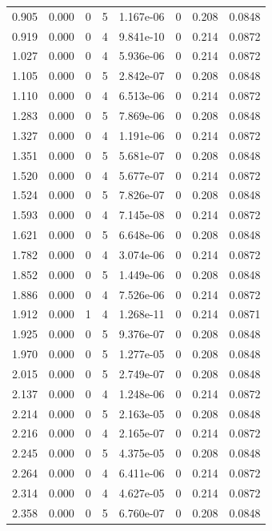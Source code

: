 \documentclass[preview]{standalone}
\begin{document}
{{\begin{tabular}{L{1.2cm}C{1.2cm} C{0.3cm}C{0.5cm} C{1.4cm}C{1.4cm} C{1.4cm}C{1.4cm}}
  0.905  &  0.000  & 0     &  5 &  1.167e-06  & 0  & 0.208 &  0.0848   \\ 
  0.919  &  0.000  & 0     &  4 &  9.841e-10  & 0  & 0.214 &  0.0872   \\ 
  1.027  &  0.000  & 0     &  4 &  5.936e-06  & 0  & 0.214 &  0.0872   \\ 
  1.105  &  0.000  & 0     &  5 &  2.842e-07  & 0  & 0.208 &  0.0848   \\ 
  1.110  &  0.000  & 0     &  4 &  6.513e-06  & 0  & 0.214 &  0.0872   \\ 
  1.283  &  0.000  & 0     &  5 &  7.869e-06  & 0  & 0.208 &  0.0848   \\ 
  1.327  &  0.000  & 0     &  4 &  1.191e-06  & 0  & 0.214 &  0.0872   \\ 
  1.351  &  0.000  & 0     &  5 &  5.681e-07  & 0  & 0.208 &  0.0848   \\ 
  1.520  &  0.000  & 0     &  4 &  5.677e-07  & 0  & 0.214 &  0.0872   \\ 
  1.524  &  0.000  & 0     &  5 &  7.826e-07  & 0  & 0.208 &  0.0848   \\ 
  1.593  &  0.000  & 0     &  4 &  7.145e-08  & 0  & 0.214 &  0.0872   \\ 
  1.621  &  0.000  & 0     &  5 &  6.648e-06  & 0  & 0.208 &  0.0848   \\ 
  1.782  &  0.000  & 0     &  4 &  3.074e-06  & 0  & 0.214 &  0.0872   \\ 
  1.852  &  0.000  & 0     &  5 &  1.449e-06  & 0  & 0.208 &  0.0848   \\ 
  1.886  &  0.000  & 0     &  4 &  7.526e-06  & 0  & 0.214 &  0.0872   \\ 
  1.912  &  0.000  & 1     &  4 &  1.268e-11  & 0  & 0.214 &  0.0871   \\ 
  1.925  &  0.000  & 0     &  5 &  9.376e-07  & 0  & 0.208 &  0.0848   \\ 
  1.970  &  0.000  & 0     &  5 &  1.277e-05  & 0  & 0.208 &  0.0848   \\ 
  2.015  &  0.000  & 0     &  5 &  2.749e-07  & 0  & 0.208 &  0.0848   \\ 
  2.137  &  0.000  & 0     &  4 &  1.248e-06  & 0  & 0.214 &  0.0872   \\ 
  2.214  &  0.000  & 0     &  5 &  2.163e-05  & 0  & 0.208 &  0.0848   \\ 
  2.216  &  0.000  & 0     &  4 &  2.165e-07  & 0  & 0.214 &  0.0872   \\ 
  2.245  &  0.000  & 0     &  5 &  4.375e-05  & 0  & 0.208 &  0.0848   \\ 
  2.264  &  0.000  & 0     &  4 &  6.411e-06  & 0  & 0.214 &  0.0872   \\ 
  2.314  &  0.000  & 0     &  4 &  4.627e-05  & 0  & 0.214 &  0.0872   \\ 
  2.358  &  0.000  & 0     &  5 &  6.760e-07  & 0  & 0.208 &  0.0848   \\ 
\hline 
\end{tabular} 

}}
\end{document}

